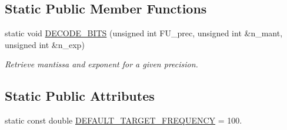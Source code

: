 \subsection*{Static Public Member Functions}
\begin{DoxyCompactItemize}
\item 
static void \hyperlink{classflopoco__wrapper_ab0789242cbc4e02a7fdb1a159441f706}{D\+E\+C\+O\+D\+E\+\_\+\+B\+I\+TS} (unsigned int F\+U\+\_\+prec, unsigned int \&n\+\_\+mant, unsigned int \&n\+\_\+exp)
\begin{DoxyCompactList}\small\item\em Retrieve mantissa and exponent for a given precision. \end{DoxyCompactList}\end{DoxyCompactItemize}
\subsection*{Static Public Attributes}
\begin{DoxyCompactItemize}
\item 
static const double \hyperlink{classflopoco__wrapper_aa0540c8401c605f646a3fca9c5fa93d6}{D\+E\+F\+A\+U\+L\+T\+\_\+\+T\+A\+R\+G\+E\+T\+\_\+\+F\+R\+E\+Q\+U\+E\+N\+CY} = 100.
\end{DoxyCompactItemize}
